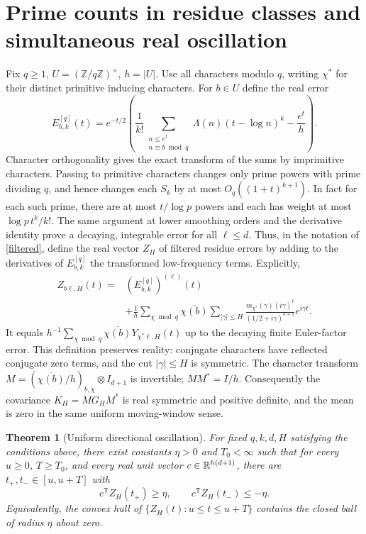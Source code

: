 \documentclass[11pt]{article}
\newtheorem{theorem}{Theorem}
\theoremstyle{remark}\newtheorem{remark}[theorem]{Remark}
\begin{document}
\section{Prime counts in residue classes and simultaneous real oscillation}
Fix $q\ge1$, $U=(\mathbb Z/q\mathbb Z)^\times$, $h=|U|$. Use all characters modulo $q$, writing $\chi^*$ for their distinct primitive inducing characters. For $b\in U$ define the real error
\[
 E_{b,k}^{[q]}(t)=e^{-t/2}\left(\frac1{k!}\sum_{\substack{n\le e^t\\n\equiv b\bmod q}}\Lambda(n)(t-\log n)^k-\frac{e^t}{h}\right).
\]
Character orthogonality gives the exact transform of the sums by imprimitive characters. Passing to primitive characters changes only prime powers with prime dividing $q$, and hence changes each $S_k$ by at most $O_q((1+t)^{k+1})$. In fact for each such prime, there are at most $t/\log p$ powers and each has weight at most $\log p\,t^k/k!$. The same argument at lower smoothing orders and the derivative identity prove a decaying, integrable error for all $\ell\le d$. Thus, in the notation of \eqref{filtered}, define the real vector $Z_H$ of filtered residue errors by adding to the derivatives of $E_{b,k}^{[q]}$ the transformed low-frequency terms. Explicitly,
\begin{align*}
 Z_{b\ell,H}(t)={}&(E_{b,k}^{[q]})^{(\ell)}(t)\\
 &+\frac1h\sum_{\chi\bmod q}\overline{\chi(b)}\sum_{|\gamma|\le H}
 \frac{m_{\chi^*}(\gamma)(i\gamma)^\ell}{(1/2+i\gamma)^{k+1}}e^{i\gamma t}.
\end{align*}
It equals $h^{-1}\sum_{\chi\bmod q}\overline{\chi(b)}Y_{\chi^*\ell,H}(t)$ up to the decaying finite Euler-factor error. This definition preserves reality: conjugate characters have reflected conjugate zero terms, and the cut $|\gamma|\le H$ is symmetric. The character transform $M=(\overline{\chi(b)}/h)_{b,\chi}\otimes I_{d+1}$ is invertible; $MM^*=I/h$. Consequently the covariance $K_H=MG_HM^*$ is real symmetric and positive definite, and the mean is zero in the same uniform moving-window sense.
\begin{theorem}[Uniform directional oscillation]\label{osc}
For fixed $q,k,d,H$ satisfying the conditions above, there exist constants $\eta>0$ and $T_0<\infty$ such that for every $u\ge0$, $T\ge T_0$, and every real unit vector $c\in\mathbb R^{h(d+1)}$, there are $t_+,t_-\in[u,u+T]$ with
\[
 c^{\mathsf T}Z_H(t_+)\ge\eta,\qquad c^{\mathsf T}Z_H(t_-)\le-\eta.
\]
Equivalently, the convex hull of $\{Z_H(t):u\le t\le u+T\}$ contains the closed ball of radius $\eta$ about zero.
\end{theorem}
\end{document}
